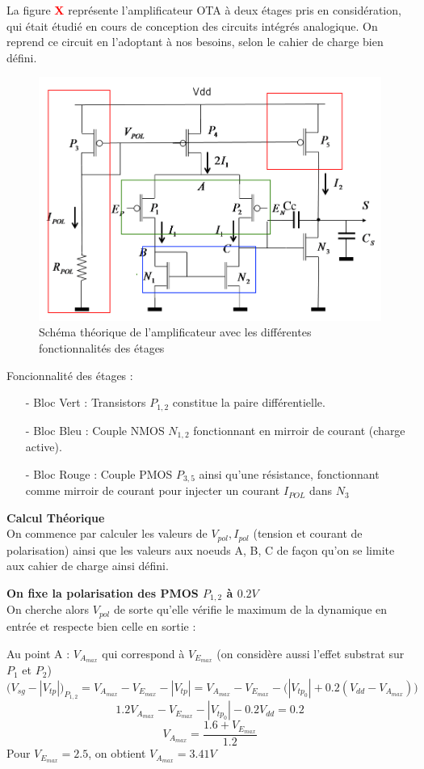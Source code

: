 \documentclass[11pt]{article}
\begin{document}
La figure \textbf{\textcolor{red}{X}} repr\'esente l'amplificateur OTA \`a deux \'etages pris
en consid\'eration, qui \'etait \'etudi\'e en cours de conception des circuits int\'egr\'es analogique\cite{TD4-AOP}.
On reprend ce circuit en l'adoptant \`a nos besoins, selon le cahier de charge bien d\'efini.

\begin{figure}[!htb]
      \centering
      \includegraphics[width=0.6\linewidth]{schema_composition_AOP_2_etages.png}
      \caption{Sch\'ema th\'eorique de l'amplificateur avec les diff\'erentes fonctionnalit\'es des \'etages}
\end{figure}%

Foncionnalit\'e des \'etages :
\begin{itemize} \itemsep -2pt
\item[-] Bloc Vert : Transistors $P_{1,2}$ constitue la paire diff\'erentielle.
\item[-] Bloc Bleu : Couple NMOS $N_{1,2}$ fonctionnant en mirroir de courant (charge active).
\item[-] Bloc Rouge : Couple PMOS $P_{3,5}$ ainsi qu'une r\'esistance, fonctionnant comme mirroir de courant
  pour injecter un courant $I_{POL}$ dans $N_{3}$
\end{itemize}

\textbf{Calcul Th\'eorique}\\
On commence par calculer les valeurs de $V_{pol}, I_{pol}$ (tension et courant de polarisation)
ainsi que les valeurs aux noeuds A, B, C de fa\c con qu'on se limite aux cahier de charge ainsi d\'efini.

\textbf{On fixe la polarisation des PMOS $P_{1,2}$ \`a $0.2 V$}\\
On cherche alors $V_{pol}$ de sorte qu'elle v\'erifie le maximum de la dynamique en entr\'ee et respecte bien
celle en sortie :

\clearpage

Au point A :
$V_{A_{max}}$ qui correspond \`a $V_{E_{max}}$ (on consid\`ere aussi l'effet substrat sur $P_1$ et $P_2$)
\[
\bigg( V_{sg} - | V_{tp} | \bigg)_{P_{1,2}} = V_{A_{max}} - V_{E_{max}} - |V_{tp}| = V_{A_{max}} - V_{E_{max}} -
\Big( | V_{tp_{0}} | + 0.2(V_{dd} - V_{A_{max}})\Big)
\]
\[
1.2V_{A_{max}} - V_{E_{max}} - | V_{tp_{0}} | - 0.2 V_{dd} = 0.2
\]
\[
V_{A_{max}} = \frac{1.6 + V_{E_{max}}}{1.2}
\]
Pour $V_{E_{max}} = 2.5$, on obtient $V_{A_{max}} = 3.41 V$
\end{document}
